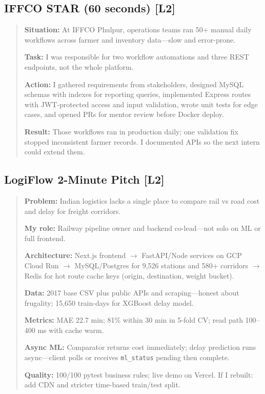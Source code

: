 \documentclass[9pt,a4paper]{article}
\newcommand{\diffLtwo}{\textcolor{orange!90!black}{\textbf{[L2]}}}
\begin{document}
\subsection{IFFCO STAR (60 seconds) \diffLtwo}
\begin{quote}\small
\textbf{Situation:} At IFFCO Phulpur, operations teams ran 50+ manual daily workflows across farmer and inventory data---slow and error-prone.

\textbf{Task:} I was responsible for two workflow automations and three REST endpoints, not the whole platform.

\textbf{Action:} I gathered requirements from stakeholders, designed MySQL schemas with indexes for reporting queries, implemented Express routes with JWT-protected access and input validation, wrote unit tests for edge cases, and opened PRs for mentor review before Docker deploy.

\textbf{Result:} Those workflows ran in production daily; one validation fix stopped inconsistent farmer records. I documented APIs so the next intern could extend them.
\end{quote}

\subsection{LogiFlow 2-Minute Pitch \diffLtwo}
\begin{quote}\small
\textbf{Problem:} Indian logistics lacks a single place to compare rail vs road cost and delay for freight corridors.

\textbf{My role:} Railway pipeline owner and backend co-lead---not solo on ML or full frontend.

\textbf{Architecture:} Next.js frontend $\rightarrow$ FastAPI/Node services on GCP Cloud Run $\rightarrow$ MySQL/Postgres for 9,526 stations and 580+ corridors $\rightarrow$ Redis for hot route cache keys (origin, destination, weight bucket).

\textbf{Data:} 2017 base CSV plus public APIs and scraping---honest about frugality; 15,650 train-days for XGBoost delay model.

\textbf{Metrics:} MAE 22.7 min; 81\% within 30 min in 5-fold CV; read path 100--400 ms with cache warm.

\textbf{Async ML:} Comparator returns cost immediately; delay prediction runs async---client polls or receives \texttt{ml\_status} pending then complete.

\textbf{Quality:} 100/100 pytest business rules; live demo on Vercel. If I rebuilt: add CDN and stricter time-based train/test split.
\end{quote}
\end{document}
